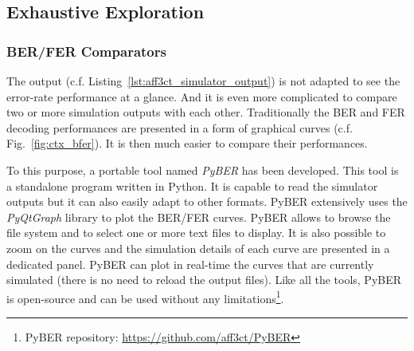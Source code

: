 \subsection{Exhaustive Exploration}


\subsubsection{BER/FER Comparators} %


The \AFFECT output (c.f. Listing~\ref{lst:aff3ct_simulator_output}) is not
adapted to see the error-rate performance at a glance. And it is even more
complicated to compare two or more simulation outputs with each other.
Traditionally the BER and FER decoding performances are presented in a form of
graphical curves (c.f. Fig.~\ref{fig:ctx_bfer}). It is then much easier to
compare their performances.

To this purpose, a portable tool named \emph{PyBER} has been developed.
This tool is a standalone program written in Python. It is capable to read the
\AFFECT simulator outputs but it can also easily adapt to other formats. PyBER
extensively uses the \emph{PyQtGraph} library to plot the BER/FER curves. PyBER
allows to browse the file system and to select one or more text files to
display. It is also possible to zoom on the curves and the simulation details of
each curve are presented in a dedicated panel. PyBER can plot in real-time the
curves that are currently simulated (there is no need to reload the \AFFECT
output files). Like all the \AFFECT tools, PyBER is open-source and can be used
without any limitations\footnote{PyBER repository:
\url{https://github.com/aff3ct/PyBER}}.

